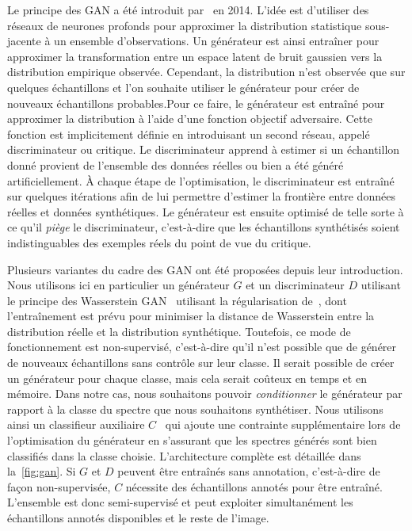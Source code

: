 Le principe des \gls{GAN} a été introduit par~\citet{goodfellow_generative_2014} en 2014. L'idée est d'utiliser des réseaux de neurones profonds pour approximer la distribution statistique sous-jacente à un ensemble d'observations. Un générateur est ainsi entraîner pour approximer la transformation entre un espace latent de bruit gaussien vers la distribution empirique observée. Cependant, la distribution n'est observée que sur quelques échantillons et l'on souhaite utiliser le générateur pour créer de nouveaux échantillons probables.Pour ce faire, le générateur est entraîné pour approximer la distribution à l'aide d'une fonction objectif adversaire. Cette fonction est implicitement définie en introduisant un second réseau, appelé discriminateur ou critique. Le discriminateur apprend à estimer si un échantillon donné provient de l'ensemble des données réelles ou bien a été généré artificiellement. À chaque étape de l'optimisation, le discriminateur est entraîné sur quelques itérations afin de lui permettre d'estimer la frontière entre données réelles et données synthétiques. Le générateur est ensuite optimisé de telle sorte à ce qu'il \emph{piège} le discriminateur, c'est-à-dire que les échantillons synthétisés soient indistinguables des exemples réels du point de vue du critique.

Plusieurs variantes du cadre des \gls{GAN} ont été proposées depuis leur introduction. Nous utilisons ici en particulier un générateur $G$ et un discriminateur $D$ utilisant le principe des Wasserstein \gls{GAN}~\cite{arjovsky_wasserstein_2017} utilisant la régularisation de~\citet{gulrajani_improved_2017}, dont l'entraînement est prévu pour minimiser la distance de Wasserstein entre la distribution réelle et la distribution synthétique. Toutefois, ce mode de fonctionnement est non-supervisé, c'est-à-dire qu'il n'est possible que de générer de nouveaux échantillons sans contrôle sur leur classe. Il serait possible de créer un générateur pour chaque classe, mais cela serait coûteux en temps et en mémoire. Dans notre cas, nous souhaitons pouvoir \emph{conditionner} le générateur par rapport à la classe du spectre que nous souhaitons synthétiser. Nous utilisons ainsi un classifieur auxiliaire $C$~\cite{odena_conditional_2017} qui ajoute une contrainte supplémentaire lors de l'optimisation du générateur en s'assurant que les spectres générés sont bien classifiés dans la classe choisie.
L'architecture complète est détaillée dans la~\cref{fig:gan}. Si $G$ et $D$ peuvent être entraînés sans annotation, c'est-à-dire de façon non-supervisée, $C$ nécessite des échantillons annotés pour être entraîné. L'ensemble est donc semi-supervisé et peut exploiter simultanément les échantillons annotés disponibles et le reste de l'image.

